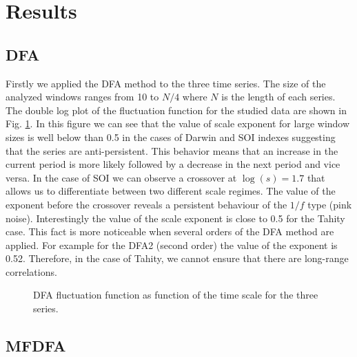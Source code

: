 \documentclass[onecolumn, preprint,aps,amsmath, amssymb, superscriptaddress]{revtex4}
\begin{document}
\section{Results}
\label{sec:resultados}

\subsection{DFA}
\label{results_dfa}

Firstly we applied the DFA method to the three time series. The size of the analyzed windows ranges from 10 to $N/4$ where $N$ is the length of each series. The double log plot of the fluctuation function for the studied data are shown in Fig. \ref{fig:dfa}. In this figure we can see that the value of scale exponent for large window sizes is well below than 0.5 in the cases of Darwin and SOI indexes suggesting that the series are anti-persistent. This behavior means that an increase in the current period is more likely followed by a decrease in the next period and vice versa. In the case of SOI we can observe a crossover at $\log(s) = 1.7$ that allows us to differentiate between two different scale regimes. The value of the exponent before the crossover reveals a persistent behaviour of the $1/f$ type (pink noise). Interestingly the value of the scale exponent is close to 0.5 for the Tahity case. This fact is more noticeable when several orders of the DFA method are applied. For example for the DFA2 (second order) the value of the exponent is 0.52. Therefore, in the case of Tahity, we cannot ensure that there are long-range correlations. 

\begin{figure}
\caption{DFA fluctuation function as function of the time scale for the three series.}
\label{fig:dfa}
\end{figure}

\subsection{MFDFA}
\label{results_mfdfa}
\end{document}

